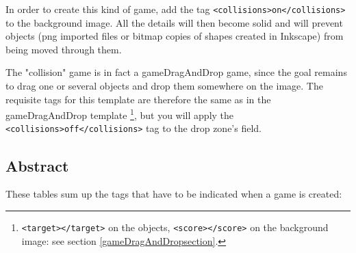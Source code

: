 In order to create this kind of game, add the tag \verb|<collisions>on</collisions>| to the 
background image. All the details will then become solid and will prevent objects 
(png imported files or bitmap copies of shapes created in Inkscape) from being moved through them.

The "collision" game is in fact a gameDragAndDrop game, since the goal remains to 
drag one or several objects and drop them somewhere on the image.
The requisite tags for this template are therefore the same as in the gameDragAndDrop template \footnote{\texttt{<target></target>} on the objects, \texttt{<score></score>} 
on the background image: see section \ref{gameDragAndDropsection}.}, but you will apply the  \verb|<collisions>off</collisions>| tag to the drop zone's  field.
\newpage
\subsection{Abstract}

These tables sum up the tags that have to be indicated when a game is created:

